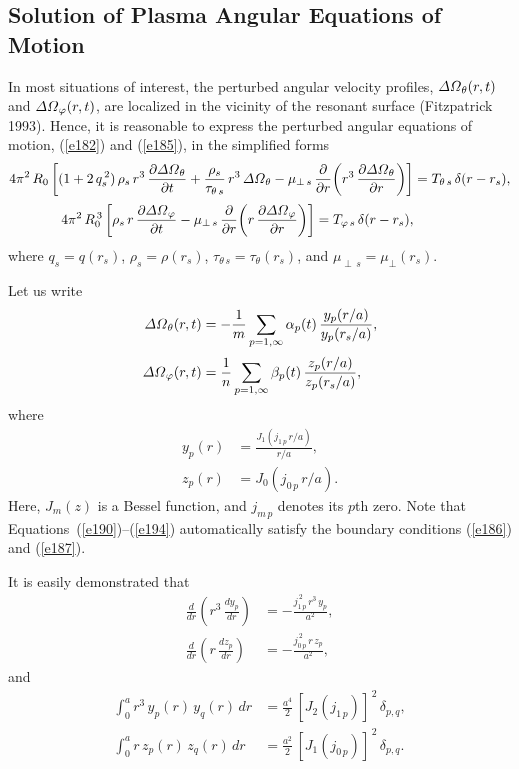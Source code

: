 \documentclass[notitlepage,12pt]{article}
\begin{document}
\subsection{Solution of Plasma Angular Equations of Motion}
In most situations of interest, the perturbed angular velocity profiles, ${\mit\Delta\Omega}_\theta(r,t)$ and ${\mit\Delta\Omega}_\varphi(r,t)$, are
localized in the vicinity of the resonant surface (Fitzpatrick 1993). Hence, it is reasonable to express  the perturbed angular
equations of motion, (\ref{e182}) and (\ref{e185}), in the simplified  forms
\begin{align}\label{e188}
4\pi^2\,R_0\left[(1+2\,q_s^{\,2})\,\rho_s\,r^3\,\frac{\partial {\mit\Delta\Omega}_\theta}{\partial t}+ \frac{\rho_s}{\tau_{\theta\,s}}\,r^3\,{\mit\Delta\Omega}_\theta-\mu_{\perp\,s}\,\frac{\partial}{\partial r}\!\left(r^3\,\frac{\partial{\mit\Delta\Omega}_\theta}{\partial r}\right)\right]
&=T_{\theta\,s}\,\delta(r-r_s),\\[0.5ex]
4\pi^2\,R_0^{\,3}\left[\rho_s\,r\,\frac{\partial {\mit\Delta\Omega}_\varphi}{\partial t}-\mu_{\perp\,s}\,\frac{\partial}{\partial r}\!\left(r\,\frac{\partial{\mit\Delta\Omega}_\varphi}{\partial r}\right)\right]
=T_{\varphi\,s}\,\delta(r-r_s),\label{e189}
\end{align}
where $q_s=q(r_s)$, $\rho_s=\rho(r_s)$, $\tau_{\theta\,s}=\tau_\theta(r_s)$, and $\mu_{\perp\,s}=\mu_\perp(r_s)$. 

Let us write
\begin{align}\label{e190}
{\mit\Delta\Omega}_\theta(r,t) &= - \frac{1}{m}\sum_{p=1,\infty} \alpha_p(t)\,\frac{y_p(r/a)}{y_p(r_s/a)},\\[0.5ex]
{\mit\Delta\Omega}_\varphi(r,t) &=  \frac{1}{n}\sum_{p=1,\infty} \beta_p(t)\,\frac{z_p(r/a)}{z_p(r_s/a)},\label{e191}
\end{align}
where
\begin{align}
y_p(r) &= \frac{J_1(j_{1\,p}\,r/a)}{r/a},\label{e193}\\[0.5ex]
z_p(r) &= J_0(j_{0\,p}\,r/a).\label{e194}
\end{align}
Here, $J_m(z)$ is a Bessel function, and $j_{m\,p}$ denotes its $p$th zero. Note that
Equations~(\ref{e190})--(\ref{e194}) automatically satisfy the boundary conditions (\ref{e186}) and (\ref{e187}). 

It is easily demonstrated that 
\begin{align}
\frac{d}{dr}\!\left(r^{3}\,\frac{dy_p}{dr}\right)&= -\frac{j_{1\,p}^{\,2}\,r^{3}\,y_p}{a^{2}},\\[0.5ex]
\frac{d}{dr}\!\left(r\,\frac{dz_p}{dr}\right)&= -\frac{j_{0\,p}^{\,2}\,r\,z_p}{a^{2}},
\end{align}
and
\begin{align}
\int_0^a r^{3}\,y_p(r)\,y_q(r)\,dr &= \frac{a^{4}}{2}\,[J_2(j_{1\,p})]^{\,2}\,\delta_{p,q},\\[0.5ex]
\int_0^a r\,z_p(r)\,z_q(r)\,dr &= \frac{a^{2}}{2}\,[J_1(j_{0\,p})]^{\,2}\,\delta_{p,q}.\label{e197}
\end{align}
\end{document}
